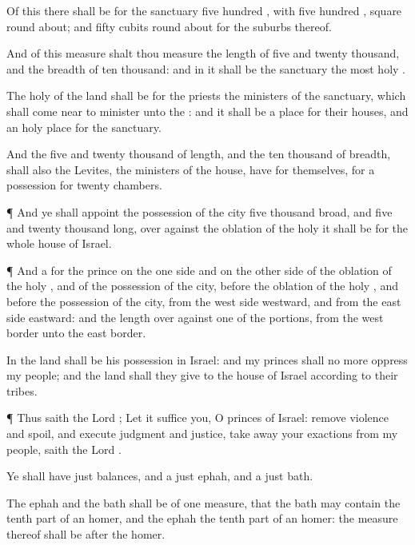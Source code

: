 {Of this there shall be for the
sanctuary
five
hundred
{}, with
five
hundred
{},
square round
about; and
fifty
cubits round
about for the
suburbs thereof.

And of this
measure shalt thou
measure the
length of
five and
twenty
thousand, and the
breadth of
ten
thousand: and in it shall be the
sanctuary
{} the
most
holy
{}.

The
holy
{} of the
land shall be for the
priests the
ministers of the
sanctuary, which shall come
near to
minister unto the
{}: and it shall be a
place for their
houses, and an holy
place for the
sanctuary.

And the
five and
twenty
thousand of
length, and the
ten
thousand of
breadth, shall also the
Levites, the
ministers of the
house, have for themselves, for a
possession for
twenty
chambers.


\par }{\PP {}¶ And ye shall
appoint the
possession of the
city
five
thousand
broad, and
five and
twenty
thousand
long, over
against the
oblation of the
holy
{} it shall be for the whole
house of
Israel.


\par }{\PP {}¶ And a
{} for the
prince on the one side and on the other side of the
oblation of the
holy
{}, and of the
possession of the
city,
before the
oblation of the
holy
{}, and
before the
possession of the
city, from the
west
side
westward, and from the
east
side
eastward: and the
length
{} over
against
one of the
portions, from the
west
border unto the
east
border.

In the
land shall be his
possession in
Israel: and my
princes shall no more
oppress my
people; and
{} the
land shall they
give to the
house of
Israel according to their
tribes.


\par }{\PP {}¶ Thus
saith the
Lord
{}; Let it
suffice you, O
princes of
Israel:
remove
violence and
spoil, and
execute
judgment and
justice, take
away your
exactions from my
people,
saith the
Lord
{}.

Ye shall have
just
balances, and a
just
ephah, and a
just
bath.

The
ephah and the
bath shall be of
one
measure, that the
bath may
contain the tenth
part of an
homer, and the
ephah the tenth
part of an
homer: the
measure thereof shall be after the
homer.

}
